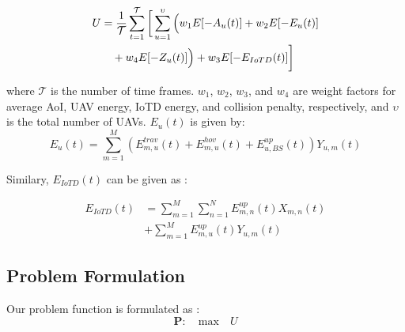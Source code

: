 \documentclass[conference]{IEEEtran}
\begin{document}
\begin{align}
U &= \frac{1}{\mathcal{T}} \sum_{t=1}^\mathcal{T} \bigg[ \sum_{u=1}^\upsilon \Big( w_1 E[-A_u(t)] + w_2 E[-E_u(t)] \notag \\
&\quad + w_4 E[-Z_u(t)] \Big) + w_3 E[-E_{IoTD}(t)] \bigg]
\end{align}

where $\mathcal{T}$ is the number of time frames. $w_1$, $w_2$, $w_3$, and $w_4$ are weight factors for average AoI, UAV energy, IoTD energy, and collision penalty, respectively, and $\upsilon$ is the total number of UAVs.
$E_u(t)$ is given by:
\begin{equation}
    E_{u}(t) = \sum_{m=1}^{M}\left (  E_{m,u}^{trav}(t) + E_{m,u}^{hov}(t) +  E_{u,BS}^{up}(t)\right )Y_{u,m}(t)
\end{equation}

Similary, $E_{IoTD}(t)$ can be given as :

\begin{equation}
\begin{split}
    E_{IoTD}(t) & = \sum_{m=1}^{M}\sum_{n=1}^{N}E_{m,n}^{up}(t)X_{m,n}(t) \\
    &+   \sum_{m=1}^{M} E_{m,u}^{up}(t)Y_{u,m}(t)
    \end{split}
\end{equation}

\subsection{Problem Formulation}
\noindent Our problem function is formulated as :
\begin{equation}\label{eq:opt-function}
    \textbf{P} :\quad \text{max} \quad U 
\end{equation}
\end{document}
